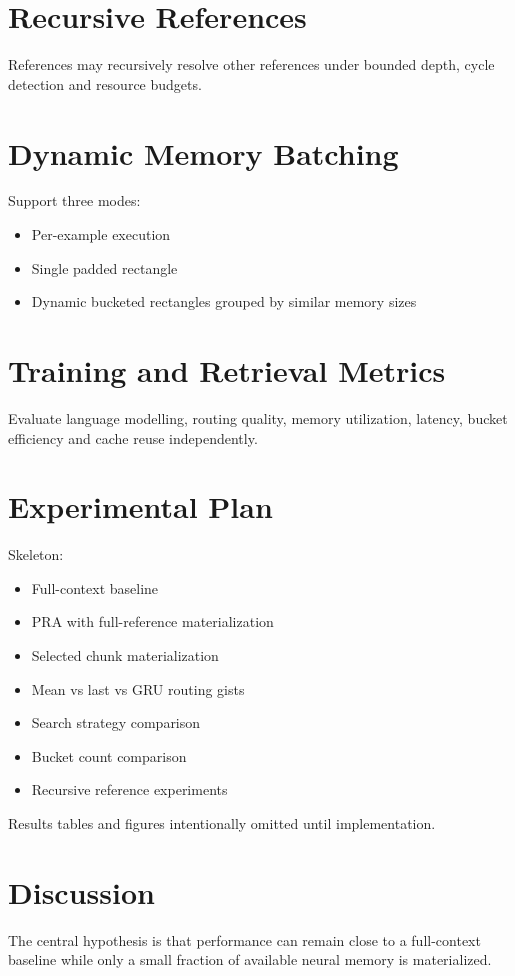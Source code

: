 \documentclass[11pt]{article}
\begin{document}
\section{Recursive References}
References may recursively resolve other references under bounded depth,
cycle detection and resource budgets.

\section{Dynamic Memory Batching}
Support three modes:
\begin{itemize}
\item Per-example execution
\item Single padded rectangle
\item Dynamic bucketed rectangles grouped by similar memory sizes
\end{itemize}

\section{Training and Retrieval Metrics}
Evaluate language modelling, routing quality, memory utilization,
latency, bucket efficiency and cache reuse independently.

\section{Experimental Plan}
Skeleton:
\begin{itemize}
\item Full-context baseline
\item PRA with full-reference materialization
\item Selected chunk materialization
\item Mean vs last vs GRU routing gists
\item Search strategy comparison
\item Bucket count comparison
\item Recursive reference experiments
\end{itemize}

Results tables and figures intentionally omitted until implementation.

\section{Discussion}
The central hypothesis is that performance can remain close to a
full-context baseline while only a small fraction of available neural memory
is materialized.
\end{document}
